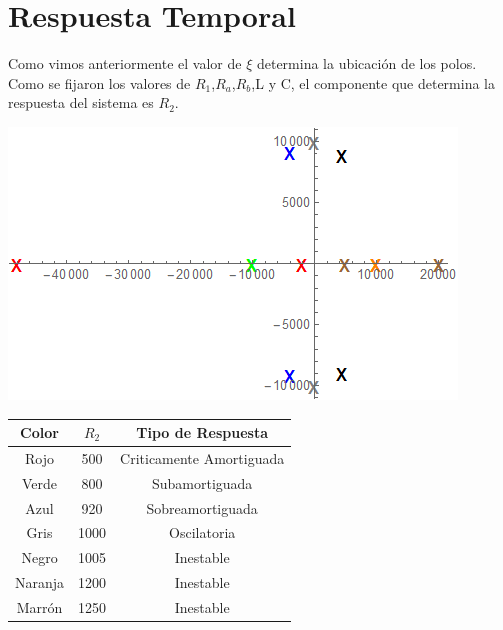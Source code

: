 \documentclass[10pt,a4paper]{article} %
\begin{document}
\section{Respuesta Temporal}
Como vimos anteriormente el valor de $\xi$ determina la ubicación de los polos. Como se fijaron los valores de $R_1$,$R_a$,$R_b$,L y C, el componente que determina la respuesta del sistema es $R_2$.
\begin{center}
	\includegraphics[scale=0.8]{polos1}
\end{center}
\begin{center}
	\begin{tabular}{|c|c|c|}
		\hline 
		Color&$R_{2}$ & Tipo de Respuesta \\ 
		\hline 
		\hline 
		Rojo&500 & Criticamente Amortiguada \\ 
		\hline 
		Verde&800 & Subamortiguada \\ 
		\hline 
		Azul&920 & Sobreamortiguada \\ 
		\hline  
		Gris&1000 &Oscilatoria \\ 
		\hline 
		Negro&1005&Inestable  \\ 
		\hline 
		Naranja&1200&Inestable  \\
		\hline
		Marrón&1250&Inestable  \\
		\hline
	\end{tabular} 
\end{center}
\end{document}
